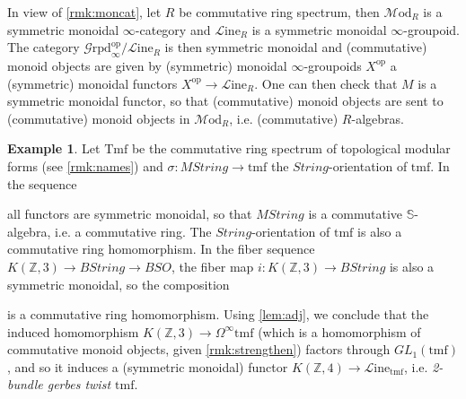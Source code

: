 \documentclass[a4paper]{book}
\newcommand{\lG}{\mathcal{G}}
\newcommand{\lL}{\mathcal{L}}
\newcommand{\lM}{\mathcal{M}}
\newcommand{\bS}{\mathbb{S}}
\newcommand{\bZ}{\mathbb{Z}}
\newcommand{\op}{\mathrm{op}}
\newcommand{\Grpd}{\lG\mathrm{rpd}} %
\renewcommand{\Line}{\lL\mathrm{ine}} %
\newcommand{\Mod}{\lM\mathrm{od}} %
\theoremstyle{definition}
\newtheorem{example}[equation]{Example}
\theoremstyle{remark}
\numberwithin{equation}{section}
\begin{document}
In view of \cref{rmk:moncat}, let $R$ be commutative ring spectrum, then $\Mod_R$ is a symmetric monoidal $\infty$-category and $\Line_R$ is a symmetric monoidal $\infty$-groupoid. The category $\Grpd^{\op}_\infty/\Line_R$ is then symmetric monoidal and (commutative) monoid objects are given by (symmetric) monoidal $\infty$-groupoids $X^{\op}$ a (symmetric) monoidal functors $X^{\op}\to\Line_R$. One can then check that $M$ is a symmetric monoidal functor, so that (commutative) monoid objects are sent to (commutative) monoid objects in $\Mod_R$, i.e. (commutative) $R$-algebras. 
\begin{example}\label{ex:tmf}
	Let $\mathrm{Tmf}$ be the commutative ring spectrum of topological modular forms (see \cref{rmk:names}) and $\sigma:MString\to\mathrm{tmf}$ the $String$-orientation of $\mathrm{tmf}$. In the sequence \begin{center}
	\end{center}all functors are symmetric monoidal, so that $MString$ is a commutative $\bS$-algebra, i.e. a commutative ring. The $String$-orientation of $\mathrm{tmf}$ is also a commutative ring homomorphism. In the fiber sequence $K(\bZ,3)\to BString\to BSO$, the fiber map $i:K(\bZ,3)\to BString$ is also a symmetric monoidal, so the composition 
	\begin{center}
	\end{center}is a commutative ring homomorphism. Using \cref{lem:adj}, we conclude that the induced homomorphism $K(\bZ,3)\to\Omega^\infty\mathrm{tmf}$ (which is a homomorphism of commutative monoid objects, given \cref{rmk:strengthen}) factors through $GL_1(\mathrm{tmf})$, and so it induces a (symmetric monoidal) functor $K(\bZ,4)\to\Line_\mathrm{tmf}$, i.e. \emph{2-bundle gerbes twist $\mathrm{tmf}$}.
\end{example}
\end{document}
